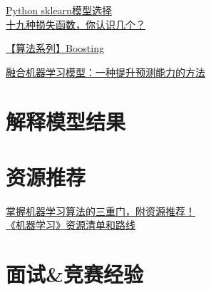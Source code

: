\documentclass[
]{book}
\begin{document}
\href{https://mp.weixin.qq.com/s?__biz=MzA4MjYwMTc5Nw==\&mid=2648930995\&idx=1\&sn=24261fd7df0378a019997e635d061dbf\&chksm=8794e899b0e3618fb5b62f6b0591c940109becaaf3f55d52bc6f9f54207b9d987854a0627bfb\&token=2004915986\&lang=en_US\#rd}{Python sklearn模型选择}\\
\href{https://mp.weixin.qq.com/s?__biz=MzA4MjYwMTc5Nw==\&mid=2648931929\&idx=1\&sn=2f13212feb7a248c8f222afcbe58e9aa\&chksm=8794ec73b0e3656543fd7bb7ae12359f396efe7cb72225d4b146805deb8c7bf123e79c7fccc7\&token=2004915986\&lang=en_US\#rd}{十九种损失函数，你认识几个？}

\href{https://mp.weixin.qq.com/s?__biz=MzA4MjYwMTc5Nw==\&mid=2648929455\&idx=1\&sn=9988f84cc48e827fb22f3e13a74e375a\&chksm=8794e685b0e36f9330838e552f427e2f8c4d0a33546a5e0ce63a1543b747c1d407b7ccecf11c\&token=2004915986\&lang=en_US\#rd}{【算法系列】Boosting}

\href{https://mp.weixin.qq.com/s?__biz=MzA4MjYwMTc5Nw==\&mid=2648931036\&idx=1\&sn=1e90d8bfab5537dce24a39a252b222ea\&chksm=8794e8f6b0e361e0c42b5946a52d003369466adc1365efbd82cac3f8e5d30b2d33a88fb9406b\&token=2004915986\&lang=en_US\#rd}{融合机器学习模型：一种提升预测能力的方法}

\hypertarget{ux89e3ux91caux6a21ux578bux7ed3ux679c}{%
\section{解释模型结果}\label{ux89e3ux91caux6a21ux578bux7ed3ux679c}}

\hypertarget{ux8d44ux6e90ux63a8ux8350}{%
\section{资源推荐}\label{ux8d44ux6e90ux63a8ux8350}}

\href{https://mp.weixin.qq.com/s?__biz=MzA4MjYwMTc5Nw==\&mid=2648931619\&idx=1\&sn=11e18589f16b341a9a1b2a0a9e16edbe\&chksm=8794ef09b0e3661f87952e3308a821afdc3d1c6e44f27f1ae80711419f8dc0585979ab9e5a2e\&token=2004915986\&lang=en_US\#rd}{掌握机器学习算法的三重门，附资源推荐！}\\
\href{https://mp.weixin.qq.com/s?__biz=MzA4MjYwMTc5Nw==\&mid=2648931349\&idx=1\&sn=ee9f32007acd0f3d9b099e4ccd0e01fa\&chksm=8794ee3fb0e367293f31b22e7506965c4b8e2b36e6ba564ccfedc8cd6ac3dd27413661fe5db5\&token=2004915986\&lang=en_US\#rd}{《机器学习》资源清单和路线}

\hypertarget{ux9762ux8bd5ux7adeux8d5bux7ecfux9a8c}{%
\section{面试\&竞赛经验}\label{ux9762ux8bd5ux7adeux8d5bux7ecfux9a8c}}
\end{document}
